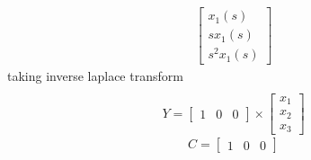 \begin{enumerate}[label=\thesection.\arabic*.,ref=\thesection.\theenumi]
\begin{gather}
\begin{bmatrix}
x_{1}(s)\\
sx_{1}(s)\\
s^2x_{1}(s)
\end{bmatrix} 
\end{gather}
taking inverse laplace transform
\begin{gather}
\\Y=
\begin{bmatrix}
1&0&0
\end{bmatrix}\times \begin{bmatrix}
x_{1}\\
x_{2}\\
x_{3}
\end{bmatrix} 
\end{gather}
\begin{equation}
C=\begin{bmatrix}
1&0&0
\end{bmatrix}
\end{equation}
%

%
\end{enumerate}

